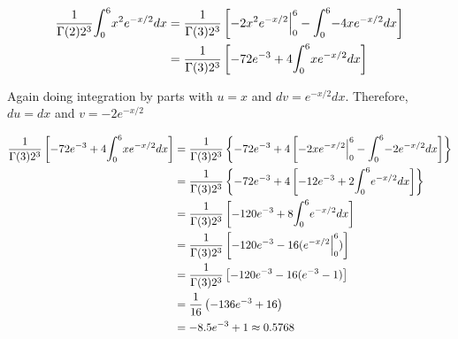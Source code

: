 \documentclass{article}
\newcommand\lint{\mathlarger{\int}}
\begin{document}
\begin{enumerate}
      \begin{align*}
	\dfrac{1}{\Gamma(2)2^3} \lint_0^6 {x^2 e^{-x/2} dx} &= \dfrac{1}{\Gamma(3)2^3}
	    \left[-2x^2e^{-x/2} \Big|_0^6 - \lint_0^6 {-4xe^{-x/2} dx}\right] \\
	  &= \dfrac{1}{\Gamma(3)2^3} \left[-72e^{-3} + 4\lint_0^6 {xe^{-x/2}dx} \right] 
      \end{align*}
      
      Again doing integration by parts with $u = x$ and $dv = e^{-x/2} dx$. Therefore, $du = dx$
      and $v = -2e^{-x/2}$
      
      \begin{align*}
       \dfrac{1}{\Gamma(3)2^3} \left[-72e^{-3} + 4\lint_0^6 {xe^{-x/2}dx} \right] &= 
	    \dfrac{1}{\Gamma(3)2^3}\left\{-72e^{-3} + 4 \left[-2xe^{-x/2} \Big|_0^6 - 
	      \lint_0^6 {-2e^{-x/2}dx}\right]\right\} \\
	  &= \dfrac{1}{\Gamma(3)2^3}\left\{-72e^{-3} + 4 \left[-12e^{-3} + 2 
	      \lint_0^6 {e^{-x/2}dx}\right]\right\} \\
	  &= \dfrac{1}{\Gamma(3)2^3} \left[-120e^{-3} + 8 \lint_0^6 {e^{-x/2}dx}\right] \\
	  &= \dfrac{1}{\Gamma(3)2^3} \left[-120e^{-3} - 16(e^{-x/2} \Big|_0^6)\right] \\
	  &= \dfrac{1}{\Gamma(3)2^3} \left[-120e^{-3} - 16 (e^{-3} - 1)\right] \\
	  &= \dfrac{1}{16} \left(-136e^{-3} + 16\right) \\
	  &= -8.5e^{-3} + 1 \approx 0.5768
      \end{align*}



    \end{enumerate}
\end{document}
